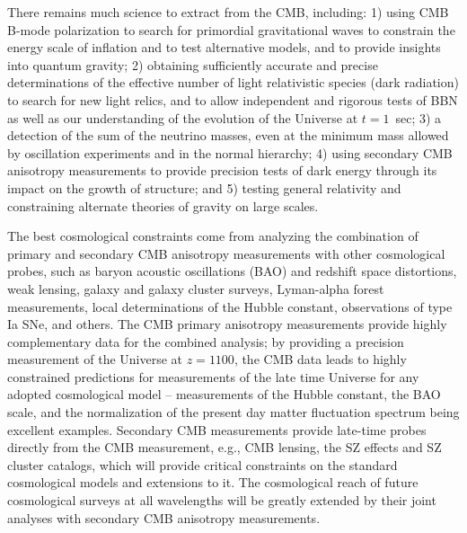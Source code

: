 There remains much science to extract from the CMB, including: 1) using CMB B-mode polarization to search for primordial gravitational waves to constrain the energy scale of inflation and to test alternative models, and to provide insights into quantum gravity; 2) obtaining sufficiently accurate and precise determinations of the effective number of light relativistic species (dark radiation) to search for new light relics, and to allow independent and rigorous tests of BBN as well as our understanding of the evolution of the Universe at $t = 1$\ sec; 3) a detection of the sum of the neutrino masses, even at the minimum mass allowed by oscillation experiments and in the normal hierarchy; 4) using secondary CMB anisotropy measurements to provide precision tests of dark energy through its impact on the growth of structure; and 5) testing general relativity and constraining alternate theories of gravity on large scales.

The best cosmological constraints come from analyzing the combination of primary and secondary CMB anisotropy measurements with other cosmological probes, such as baryon acoustic oscillations (BAO) and redshift space distortions, weak lensing, galaxy and galaxy cluster surveys, Lyman-alpha forest measurements, local determinations of the Hubble constant, observations of type Ia SNe, and others. The CMB primary anisotropy measurements provide highly complementary data for the combined analysis;  by providing a precision measurement of the Universe at $z = 1100$, the CMB data leads to highly constrained predictions for measurements of the late time Universe for any adopted cosmological model  -- measurements of the Hubble constant, the BAO scale, and the normalization of the present day matter fluctuation spectrum being excellent examples. Secondary CMB measurements provide late-time probes directly from the CMB measurement, e.g., CMB lensing, the SZ effects and SZ cluster catalogs, which will provide critical constraints on the standard cosmological models and extensions to it. The cosmological reach of future cosmological surveys at all wavelengths will be greatly extended by their joint analyses with secondary CMB anisotropy measurements. 


